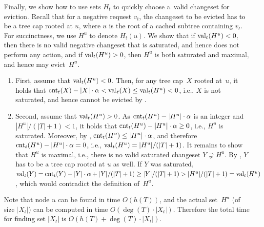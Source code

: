 Finally, we show how to use sets $H_t$ to quickly choose a~valid changeset for
eviction. Recall that for a negative request $v_t$, the changeset to be
evicted has to be a tree cap rooted at $u$, where $u$ is the root of a cached subtree
containing $v_t$. For succinctness, we use $H^u$ to denote $H_t(u)$. We show
that if $\textrm{val}_t(H^u) < 0$, then there is no valid negative changeset that is
saturated, and hence \ALGTC does not perform any action, and if $\textrm{val}_t(H^u) >
0$, then $H^u$ is both saturated and maximal, and hence \ALGTC may evict~$H^u$.

\begin{enumerate} 
\item First, assume that $\textrm{val}_t(H^u) < 0$. Then, for any tree cap~$X$ rooted
at~$u$, it holds that $\textrm{cnt}_t(X) - |X| \cdot \alpha < \textrm{val}_t(X) \leq
\textrm{val}_t(H^u) < 0$, i.e., $X$ is not saturated, and hence cannot be evicted by
\ALGTC.

\item Second, assume that $\textrm{val}_t(H^u) > 0$. As $\textrm{cnt}_t(H^u) - |H^u| \cdot
\alpha$ is an integer and $|H^u|/(|T|+1) < 1$, it holds that $\textrm{cnt}_t(H^u) -
|H^u| \cdot \alpha \geq 0$, i.e., $H^u$ is saturated. Moreover, by
, $\textrm{cnt}_t(H^u) \leq |H^u| \cdot
\alpha$, and therefore $\textrm{cnt}_t(H^u) - |H^u| \cdot \alpha = 0$, i.e.,
$\textrm{val}_t(H^u) = |H^u| / (|T|+1)$. It remains to show that $H^u$ is maximal,
i.e., there is no valid saturated changeset $Y \supsetneq H^u$. By
, $Y$ has to be a tree cap
rooted at $u$ as well. If $Y$ was saturated, $\textrm{val}_t(Y) = \textrm{cnt}_t(Y) - |Y|
\cdot \alpha + |Y| / (|T|+1) \geq |Y| / (|T|+1) > |H^u|/(|T|+1) = \textrm{val}_t(H^u)$, 
which would contradict the definition of~$H^u$.
\end{enumerate}

Note that node $u$ can be found in time $O(h(T))$, and the 
actual set~$H^u$ (of size $|X_t|$) can be computed 
in time $O(\deg(T) \cdot |X_t|)$. Therefore the total time 
for finding set $|X_t|$ is $O(h(T) + \deg(T) \cdot |X_t|)$.


%

